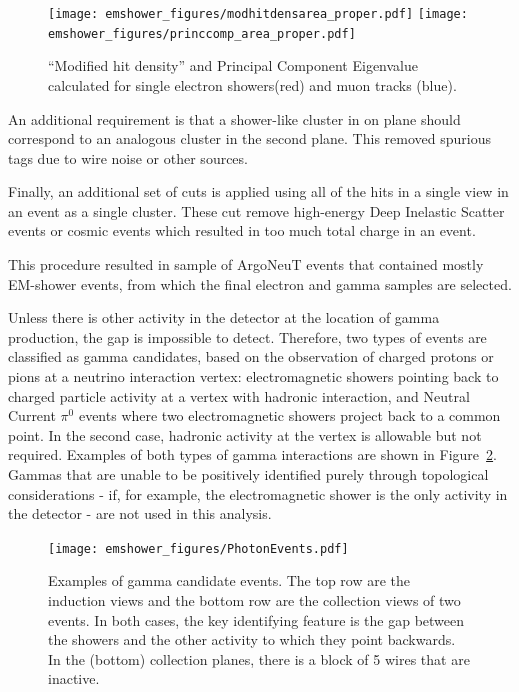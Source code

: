 \begin{figure}[ht]
\centering
\texttt{[image: emshower\_figures/modhitdensarea\_proper.pdf]}
\texttt{[image: emshower\_figures/princcomp\_area\_proper.pdf]}
\caption[Track/Shower Discrimination Metrics]{\label{fig:separation} ``Modified hit density'' and Principal Component Eigenvalue calculated for single electron showers(red) and muon tracks (blue).}
\end{figure}

An additional requirement is that a shower-like cluster in on plane should correspond to an analogous cluster in the second plane. This removed spurious tags due to wire noise or other sources.




Finally, an additional set of cuts is applied using all of the hits in a single view in an event as a single cluster. These cut remove high-energy Deep Inelastic Scatter events or cosmic events which resulted in too much total charge in an event. 

This procedure resulted in sample of ArgoNeuT events that contained mostly EM-shower events, from which the final electron and gamma samples are selected.

Unless there is other activity in the detector at the location of gamma production, the gap is impossible to detect.  Therefore, two types of events are classified as gamma candidates, based on the observation of charged protons or pions at a neutrino interaction vertex: electromagnetic showers pointing back to charged particle activity at a vertex with hadronic interaction, and Neutral Current $\pi^0$ events where two electromagnetic showers project back to a common point.  In the second case, hadronic activity at the vertex is allowable but not required.  Examples of both types of gamma interactions are shown in Figure~\ref{fig:photons}.  Gammas that are unable to be positively identified purely through topological considerations - if, for example, the electromagnetic shower is the only activity in the detector - are not used in this analysis.



\begin{figure}[ht]
\centering
\texttt{[image: emshower\_figures/PhotonEvents.pdf]}
\caption[Photon Events in \argoneut]{\label{fig:photons} Examples of gamma candidate events.  The top row are the induction views and the bottom row are the collection views of two events. In both cases, the key identifying feature is the gap between the showers and the other activity to which they point backwards.  In the (bottom) collection planes, there is a block of 5 wires that are inactive.}
\end{figure}

